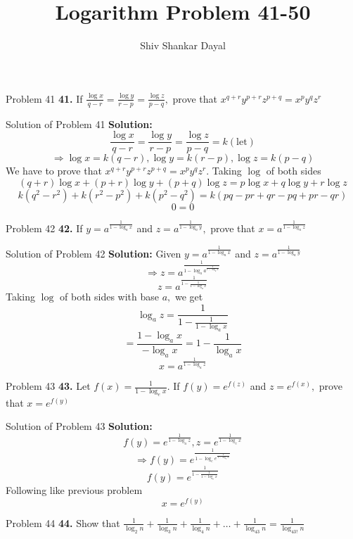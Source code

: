 \documentclass[aspectratio=1610,8pt]{beamer}
\title{Logarithm Problem 41-50}
\author[Shiv Shankar Dayal]{Shiv Shankar Dayal}
\begin{document}
\begin{frame}
  \titlepage
\end{frame}
\begin{frame}{Problem 41}
  \textbf{41.} If $\frac{\log x}{q - r} = \frac{\log y}{r - p} = \frac{\log z}{p - q},$ prove that $x^{q+r}y^{p+r}z^{p+q} = x^py^qz^r$
\end{frame}
\begin{frame}{Solution of Problem 41}
  \textbf{Solution:} $$\frac{\log x}{q - r} = \frac{\log y}{r - p} = \frac{\log z}{p - q} = k(\text{let})$$
  $$\Rightarrow \log x = k(q - r), \log y = k(r - p), \log z = k(p - q)$$
  We have to prove that $x^{q+r}y^{p+r}z^{p+q} = x^py^qz^r.$ Taking $\log$ of both sides
  $$(q + r)\log x + (p + r)\log y + (p + q)\log z = p\log x + q\log y + r\log z$$
  $$k(q^2 - r^2) + k(r^2 - p^2) + k(p^2 - q^2) = k(pq - pr + qr - pq + pr - qr)$$
  $$0 = 0$$
\end{frame}
\begin{frame}{Problem 42}
  \textbf{42.} If $y = a^{\frac{1}{1 - \log_ax}}$ and $z = a^{\frac{1}{1 -\log_ay}},$ prove that $x = a^{\frac{1}{1 - \log_az}}$
\end{frame}
\begin{frame}{Solution of Problem 42}
  \textbf{Solution:} Given $y = a^{\frac{1}{1 - \log_ax}}$ and $z = a^{\frac{1}{1 -\log_ay}}$
  $$\Rightarrow z = a^{\frac{1}{1 - \log_a{a^{\frac{1}{1 - \log_ax}}}}}$$
  $$z = a^{\frac{1}{1 - {\frac{1}{1 - \log_ax}}}}$$
  Taking $\log$ of both sides with base $a,$ we get
  $$\log_az = \frac{1}{1 - \frac{1}{1-\log_ax}}$$
  $$= \frac{1 - \log_ax}{-\log_ax} = 1 - \frac{1}{\log_ax}$$
  $$x = a^{\frac{1}{1 - \log_az}}$$
\end{frame}
\begin{frame}{Problem 43}
  \textbf{43.} Let $f(x) = \frac{1}{1 - \log_e x}.$ If $f(y) = e^{f(z)}$ and $z = e^{f(x)},$ prove that $x = e^{f(y)}$
\end{frame}
\begin{frame}{Solution of Problem 43}
  \textbf{Solution:} $$f(y) = e^{\frac{1}{1 - \log_az}}, z = e^{\frac{1}{1- \log_ex}}$$
  $$\Rightarrow f(y) = e^{\frac{1}{1 - \log_ee^{\frac{1}{1 - \log_ex}}}}$$
  $$f(y) = e^{\frac{1}{1 - {\frac{1}{1 - \log_ex}}}}$$
  Following like previous problem
  $$x = e^{f(y)}$$
\end{frame}
\begin{frame}{Problem 44}
  \textbf{44.} Show that $\frac{1}{\log_2n} + \frac{1}{\log_3n} + \frac{1}{\log_4n} + \ldots + \frac{1}{\log_{43}n} = \frac{1}{\log_{43!}n}$
\end{frame}
\end{document}
